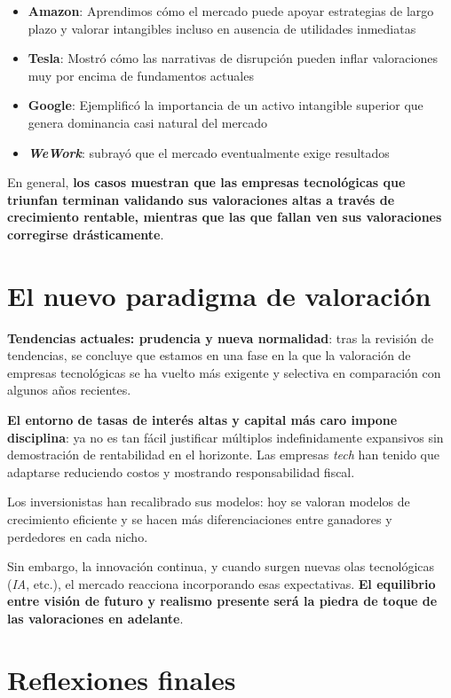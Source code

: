 \begin{itemize}
    \item \textbf{Amazon}: Aprendimos cómo el mercado puede apoyar estrategias de largo plazo y valorar intangibles incluso en ausencia de utilidades inmediatas
    \item \textbf{Tesla}: Mostró cómo las narrativas de disrupción pueden inflar valoraciones muy por encima de fundamentos actuales
    \item \textbf{Google}: Ejemplificó la importancia de un activo intangible superior que genera dominancia casi natural del mercado
    \item \textbf{\emph{WeWork}}: subrayó que el mercado eventualmente exige resultados
\end{itemize}

En general, \textbf{los casos muestran que las empresas tecnológicas que triunfan terminan validando sus valoraciones altas a través de crecimiento rentable, mientras que las que fallan ven sus valoraciones corregirse drásticamente}.

\section{El nuevo paradigma de valoración}

\textbf{Tendencias actuales: prudencia y nueva normalidad}: tras la revisión de tendencias, se concluye que estamos en una fase en la que la valoración de empresas tecnológicas se ha vuelto más exigente y selectiva en comparación con algunos años recientes.

\textbf{El entorno de tasas de interés altas y capital más caro impone disciplina}: ya no es tan fácil justificar múltiplos indefinidamente expansivos sin demostración de rentabilidad en el horizonte. Las empresas \emph{tech} han tenido que adaptarse reduciendo costos y mostrando responsabilidad fiscal.

Los inversionistas han recalibrado sus modelos: hoy se valoran modelos de crecimiento eficiente y se hacen más diferenciaciones entre ganadores y perdedores en cada nicho.

Sin embargo, la innovación continua, y cuando surgen nuevas olas tecnológicas (\emph{IA}, etc.), el mercado reacciona incorporando esas expectativas. \textbf{El equilibrio entre visión de futuro y realismo presente será la piedra de toque de las valoraciones en adelante}.

\section{Reflexiones finales}

